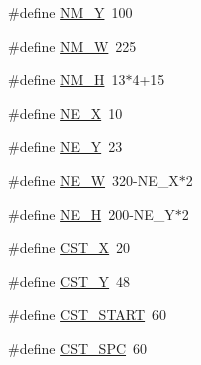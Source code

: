 \begin{DoxyCompactItemize}
\item 
\#define \hyperlink{WL__MENU_8H_a3b8dafeec7205f4cf6411c1c177f7acc}{NM\_\-Y}~100
\item 
\#define \hyperlink{WL__MENU_8H_a42988533be9ee3462e8dd820e852c69e}{NM\_\-W}~225
\item 
\#define \hyperlink{WL__MENU_8H_affe12a31ae23e18983089780977546e4}{NM\_\-H}~13$\ast$4+15
\item 
\#define \hyperlink{WL__MENU_8H_affb8b54e656a6b139ffc7a8ea9d8621b}{NE\_\-X}~10
\item 
\#define \hyperlink{WL__MENU_8H_ace26f50287df4fa928622557b530cfec}{NE\_\-Y}~23
\item 
\#define \hyperlink{WL__MENU_8H_ab6ee9aa27ac3d8b20b387e1e5f7e61cc}{NE\_\-W}~320-\/NE\_\-X$\ast$2
\item 
\#define \hyperlink{WL__MENU_8H_a40f32b371fcb5d3259aefeaffc947b4a}{NE\_\-H}~200-\/NE\_\-Y$\ast$2
\item 
\#define \hyperlink{WL__MENU_8H_ae20f87370554674ccffc172a47836ce8}{CST\_\-X}~20
\item 
\#define \hyperlink{WL__MENU_8H_a91fb5cd9f1046d4ed9b6defd46c77604}{CST\_\-Y}~48
\item 
\#define \hyperlink{WL__MENU_8H_a750f59be9efaeb9416f671951f66d16d}{CST\_\-START}~60
\item 
\#define \hyperlink{WL__MENU_8H_a08b559e4021707910677ba5d7700e354}{CST\_\-SPC}~60
\end{DoxyCompactItemize}
